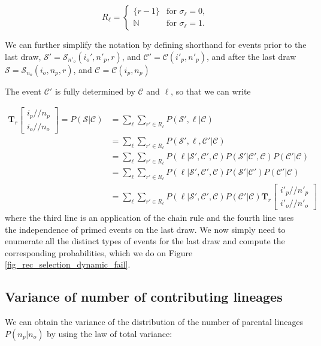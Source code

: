 \documentclass[review,nonatbib]{elsarticle}
\newcommand{\dslash}{/\!\!/}
\newcommand{\Coalc}[4]{\begin{bmatrix}#1\dslash #2 \\ #3\dslash #4 \end{bmatrix}}
\newcommand{\CC}{\mathcal{C}}
\newcommand{\ms}{\mathcal{S}}
\begin{document}
\begin{equation}
  R_\ell = \begin{cases}
    \{r-1\}    & \text{for } \sigma_\ell = 0, \\
    \mathbb{N} & \text{for } \sigma_\ell = 1.
  \end{cases}
\end{equation}

We can further simplify the notation by defining shorthand for events prior to the last draw,
 $\ms' = \ms_{n'_o}(i_o', n'_p, r)$, and $\CC' = \CC{(i'_p,n'_p)}$, and after the
last draw $\ms = \ms_{n_o}(i_o, n_p, r)$, and $\CC = \CC{(i_p,n_p)}$

The event  $\CC'$ is fully determined by  $\CC$ and $\ell$, so that we can write

\begin{equation}
  \begin{split}
    \mathbf{T}_{r}\Coalc{i_p}{n_p}{i_o}{n_o} = P(\ms| \CC) &= \sum_\ell \sum_{r' \in R_\ell}
    P(\ms',\ell | \CC) \\
    &=\sum_\ell \sum_{r' \in R_\ell}P( \ms',\ell, \CC' |\CC) \\
    &=\sum_\ell \sum_{r' \in R_\ell}P(\ell | \ms', \CC', \CC ) P( \ms'| \CC', \CC)  P(\CC' |\CC) \\
    &=\sum_\ell \sum_{r' \in R_\ell}P(\ell | \ms', \CC', \CC ) P( \ms'| \CC')       P(\CC' |\CC) \\
    &=\sum_\ell \sum_{r' \in R_\ell}P(\ell | \ms', \CC', \CC ) P(\CC' |\CC)  \mathbf{T}_{r}\Coalc{i'_p}{n'_p}{i'_o}{n'_o}
  \end{split}
\end{equation}
where the third line is an application of the chain rule and the fourth line uses the independence
of primed events on the last draw.  We now simply need to enumerate all the distinct types of
events for the last draw and compute the corresponding probabilities, which we do on Figure
\ref{fig_rec_selection_dynamic_fail}.


\subsection{Variance of number of contributing lineages}
\label{subsec_apx_variance}

We can obtain the variance of the distribution of the number of parental lineages $P(n_p | n_o)$ by using the law of total variance:
\end{document}
